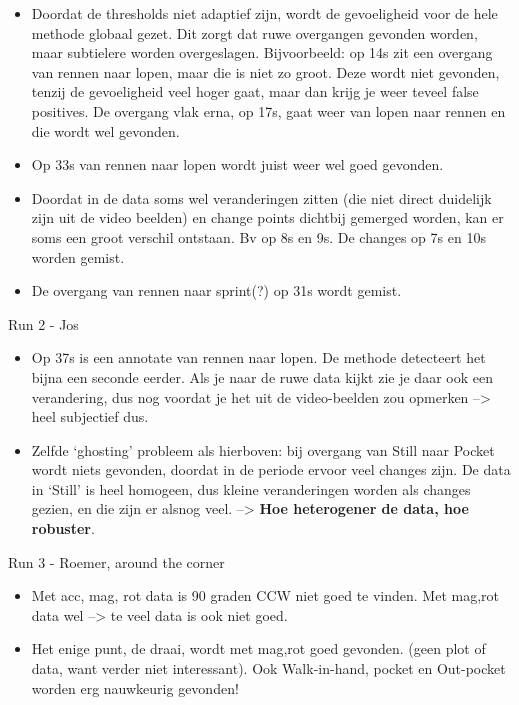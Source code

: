\begin{itemize}
  \item Doordat de thresholds niet adaptief zijn, wordt de gevoeligheid voor de hele methode globaal gezet.
  Dit zorgt dat ruwe overgangen gevonden worden, maar subtielere worden overgeslagen.
  Bijvoorbeeld: op 14s zit een overgang van rennen naar lopen, maar die is niet zo groot. Deze wordt niet gevonden, tenzij de gevoeligheid veel hoger gaat, maar dan krijg je weer teveel false positives. De overgang vlak erna, op 17s, gaat weer van lopen naar rennen en die wordt wel gevonden.
  \item Op 33s van rennen naar lopen wordt juist weer wel goed gevonden.
  \item Doordat in de data soms wel veranderingen zitten (die niet direct duidelijk zijn uit de video beelden) en change points dichtbij gemerged worden, kan er soms een groot verschil ontstaan. Bv op 8s en 9s. De changes op 7s en 10s worden gemist.
  \item De overgang van rennen naar sprint(?) op 31s wordt gemist.
\end{itemize}

Run 2 - Jos \\
\begin{itemize}
  \item Op 37s is een annotate van rennen naar lopen. De methode detecteert het bijna een seconde eerder. Als je naar de ruwe data kijkt zie je daar ook een verandering, dus nog voordat je het uit de video-beelden zou opmerken --> heel subjectief dus.
  \item Zelfde `ghosting' probleem als hierboven: bij overgang van Still naar Pocket wordt niets gevonden, doordat in de periode ervoor veel changes zijn. De data in `Still' is heel homogeen, dus kleine veranderingen worden als changes gezien, en die zijn er alsnog veel. --> \textbf{Hoe heterogener de data, hoe robuster}.
\end{itemize}

Run 3 - Roemer, around the corner \\
\begin{itemize}
  \item Met acc, mag, rot data is 90 graden CCW niet goed te vinden. Met mag,rot data wel --> te veel data is ook niet goed.
  \item Het enige punt, de draai, wordt met mag,rot goed gevonden. (geen plot of data, want verder niet interessant). Ook Walk-in-hand, pocket en Out-pocket worden erg nauwkeurig gevonden!
\end{itemize}

